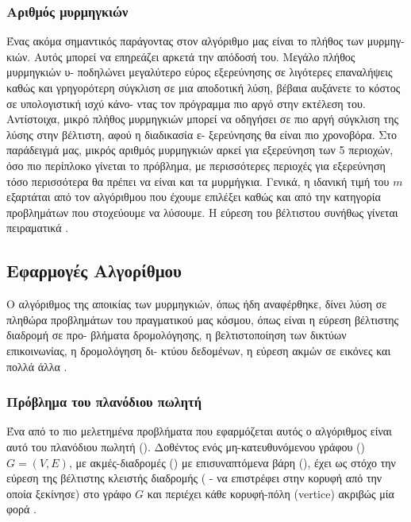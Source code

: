 \subsubsection{Αριθμός μυρμηγκιών}
Ένας ακόμα σημαντικός παράγοντας στον αλγόριθμο μας είναι το πλήθος των μυρμηγ-κιών. Αυτός μπορεί να επηρεάζει αρκετά την απόδοσή του. Μεγάλο πλήθος μυρμηγκιών υ- ποδηλώνει μεγαλύτερο εύρος εξερεύνησης σε λιγότερες επαναλήψεις καθώς και γρηγορότερη σύγκλιση σε μια αποδοτική λύση, βέβαια αυξάνετε το κόστος σε υπολογιστική ισχύ κάνο- ντας τον πρόγραμμα πιο αργό στην εκτέλεση του. Αντίστοιχα, μικρό πλήθος μυρμηγκιών μπορεί να οδηγήσει σε πιο αργή σύγκλιση της λύσης στην βέλτιστη, αφού η διαδικασία ε- ξερεύνησης θα είναι πιο χρονοβόρα. Στο παράδειγμά μας, μικρός αριθμός μυρμηγκιών αρκεί για εξερεύνηση των 5 περιοχών, όσο πιο περίπλοκο γίνεται το πρόβλημα, με περισσότερες περιοχές για εξερεύνηση τόσο περισσότερα θα πρέπει να είναι και τα μυρμήγκια. Γενικά, η ιδανική τιμή του $m$ εξαρτάται από τον αλγόριθμου  που έχουμε επιλέξει καθώς και από την κατηγορία προβλημάτων που στοχεύουμε να λύσουμε. Η εύρεση του βέλτιστου συνήθως γίνεται πειραματικά \cite{dorigo2003ant}.


\subsection{Εφαρμογές Αλγορίθμου}
Ο αλγόριθμος της αποικίας των μυρμηγκιών, όπως ήδη αναφέρθηκε, δίνει λύση σε πληθώρα προβλημάτων του πραγματικού μας κόσμου, όπως είναι η εύρεση βέλτιστης διαδρομή σε προ- βλήματα δρομολόγησης, η βελτιστοποίηση των δικτύων επικοινωνίας, η δρομολόγηση δι- κτύου δεδομένων, η εύρεση ακμών σε εικόνες και πολλά άλλα \cite{manwlopoulos2014thewria}. 

\subsubsection{Πρόβλημα του πλανόδιου πωλητή}
Ένα από το πιο μελετημένα προβλήματα που εφαρμόζεται αυτός ο αλγόριθμος είναι αυτό του πλανόδιου πωλητή (). Δοθέντος ενός μη-κατευθυνόμενου γράφου () $G=(V,E)$, με ακμές-διαδρομές () με επισυναπτόμενα βάρη (), έχει ως στόχο την εύρεση της βέλτιστης κλειστής διαδρομής ( - να επιστρέφει στην κορυφή από την οποία ξεκίνησε) στο γράφο $G$ και περιέχει κάθε κορυφή-πόλη (vertice) ακριβώς μία φορά \cite{blum2005ant}. 

